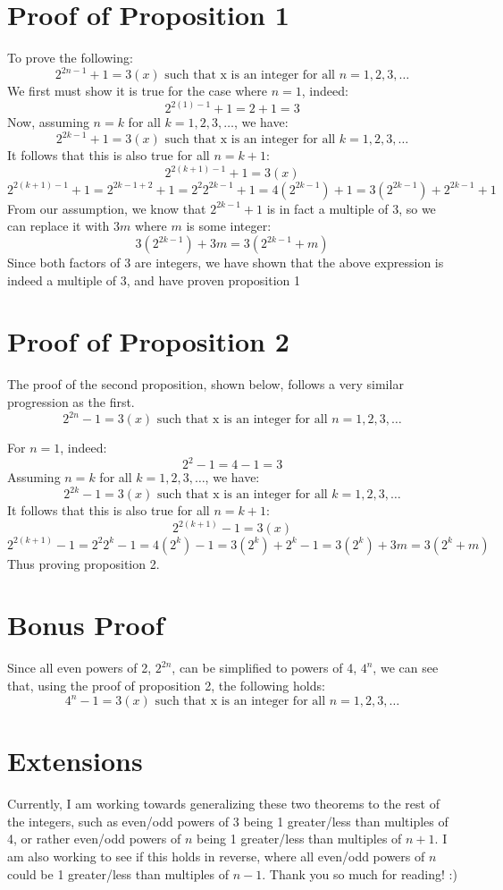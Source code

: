 \documentclass[12pt, letterpaper]{article}
\theoremstyle{definition}
\theoremstyle{definition}
\theoremstyle{definition}
\begin{document}
\section{Proof of Proposition 1}
To prove the following:
\[2^{2n-1} + 1 = 3(x) \mbox{ such that x is an integer for all } n = 1,2,3,\dots\]
We first must show it is true for the case where \(n=1\), indeed:
\[2^{2(1)-1} + 1 = 2 + 1 = 3\]
Now, assuming \(n=k\) for all \(k = 1,2,3,\dots\), we have:
\[2^{2k-1} + 1 = 3(x) \mbox{ such that x is an integer for all } k = 1,2,3,\dots\]
It follows that this is also true for all \(n=k+1\):
\[2^{2(k+1)-1} + 1 = 3(x)\]
\[2^{2(k+1)-1} + 1 = 2^{2k-1 + 2} + 1 = 2^2 2^{2k-1} + 1 = 4(2^{2k-1}) + 1 = 3(2^{2k-1}) + 2^{2k-1} + 1 \]
From our assumption, we know that \(2^{2k-1} + 1\) is in fact a multiple of 3, so we can replace it with \(3m\) where \(m\) is some integer:
\[3(2^{2k-1}) + 3m = 3(2^{2k-1} + m)\]
Since both factors of 3 are integers, we have shown that the above expression is indeed a multiple of 3, and have proven proposition 1

\section{Proof of Proposition 2}
The proof of the second proposition, shown below, follows a very similar progression as the first.
\[2^{2n} - 1 = 3(x) \mbox{ such that x is an integer for all } n = 1,2,3,\dots\]

For \(n=1\), indeed:
\[2^2 - 1 = 4-1 = 3\]
Assuming \(n=k\) for all \(k = 1,2,3,\dots\), we have:
\[2^{2k} - 1 = 3(x) \mbox{ such that x is an integer for all } k = 1,2,3,\dots\]
It follows that this is also true for all \(n=k+1\):
\[2^{2(k+1)} - 1 = 3(x)\]
\[2^{2(k+1)} - 1 = 2^2 2^k -1 = 4(2^k)-1= 3(2^k) + 2^k-1 = 3(2^k) + 3m = 3(2^k+m)\]
Thus proving proposition 2.

\section{Bonus Proof}
Since all even powers of 2, \(2^{2n}\), can be simplified to powers of 4, \(4^n\), we can see that, using the proof of proposition 2, the following holds:
\[4^{n} - 1 = 3(x) \mbox{ such that x is an integer for all } n = 1,2,3,\dots\]

\section{Extensions}
Currently, I am working towards generalizing these two theorems to the rest of the integers, such as even/odd powers of 3 being 1 greater/less than multiples of 4, 
or rather even/odd powers of \(n\) being 1 greater/less than multiples of \(n+1\). I am also working to see if this holds in reverse, where all even/odd powers of \(n\) could be 1 greater/less than multiples of \(n-1\).
Thank you so much for reading! :)
\end{document}
